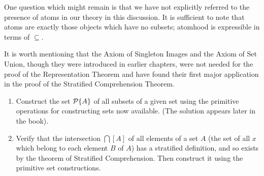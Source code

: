One question which might remain is that we have not explicitly
referred to the presence of atoms in our theory in this
discussion.
It is sufficient to note that atoms are exactly those objects which
have no subsets; atomhood is expressible in terms of $\subseteq$.

It is worth mentioning that the Axiom of Singleton Images and the Axiom of Set Union, though they were introduced
in earlier chapters, were not needed for the proof of the Representation
Theorem and have found their first major application in the proof of the
Stratified Comprehension Theorem.


\Exercises

\begin{enumerate}
\item Construct the set ${\cal P}\{A\}$ of all subsets of a given
  set using the primitive  operations  for constructing sets now available.
  (The solution appears later in the book).

\item  Verify that the intersection $\bigcap[A]$ of all
  elements of a set $A$ (the set of all $x$ which belong to each element $B$ of
  $A$) has a stratified definition, and so exists by the
  theorem of Stratified Comprehension.
  Then construct it using the primitive set constructions.
\end{enumerate}
